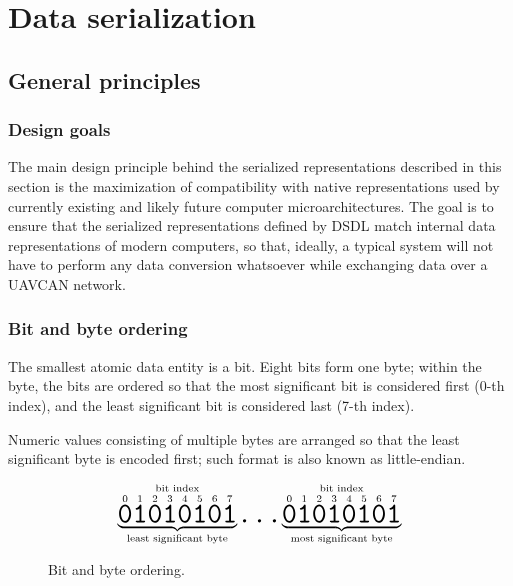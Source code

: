 \section{Data serialization}\label{sec:dsdl_data_serialization}

\newcommand{\hugett}[1]{\texttt{\huge{#1}}}

\subsection{General principles}

\subsubsection{Design goals}

The main design principle behind the serialized representations described in this section is
the maximization of compatibility with native representations used by currently existing and
likely future computer microarchitectures.
The goal is to ensure that the serialized representations defined by DSDL match internal data representations of
modern computers, so that, ideally, a typical system will not have to perform any data conversion whatsoever while
exchanging data over a UAVCAN network.

\subsubsection{Bit and byte ordering}

The smallest atomic data entity is a bit.
Eight bits form one byte;
within the byte, the bits are ordered so that the most significant bit is considered first (0-th index),
and the least significant bit is considered last (7-th index).

Numeric values consisting of multiple bytes are arranged so that the least significant byte is encoded first;
such format is also known as little-endian.

\begin{figure}[H]
    $$
    \overset{\text{bit index}}{%
        \underbrace{%
            \overset{0}{\hugett{0}}
            \overset{1}{\hugett{1}}
            \overset{2}{\hugett{0}}
            \overset{3}{\hugett{1}}
            \overset{4}{\hugett{0}}
            \overset{5}{\hugett{1}}
            \overset{6}{\hugett{0}}
            \overset{7}{\hugett{1}}
        }_\text{least significant byte}%
    }
    \hugett{\ldots}
    \overset{\text{bit index}}{%
        \underbrace{%
            \overset{0}{\hugett{0}}
            \overset{1}{\hugett{1}}
            \overset{2}{\hugett{0}}
            \overset{3}{\hugett{1}}
            \overset{4}{\hugett{0}}
            \overset{5}{\hugett{1}}
            \overset{6}{\hugett{0}}
            \overset{7}{\hugett{1}}
        }_\text{most significant byte}%
    }
    $$
    \caption{Bit and byte ordering.\label{fig:dsdl_serialization_bit_ordering}}
\end{figure}

